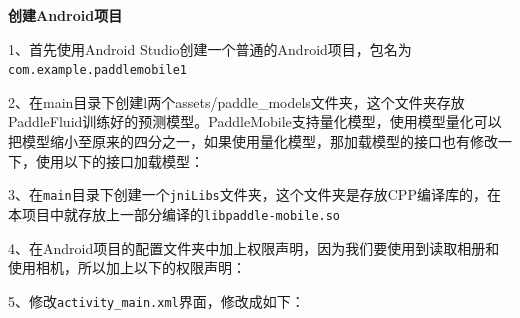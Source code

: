 \textbf{创建Android项目}

1、首先使用Android
Studio创建一个普通的Android项目，包名为\texttt{com.example.paddlemobile1}

2、在main目录下创建l两个assets/paddle\_models文件夹，这个文件夹存放PaddleFluid训练好的预测模型。PaddleMobile支持量化模型，使用模型量化可以把模型缩小至原来的四分之一，如果使用量化模型，那加载模型的接口也有修改一下，使用以下的接口加载模型：

\begin{Shaded}
\begin{Highlighting}[]
    \NormalTok{(}
\end{Highlighting}
\end{Shaded}

3、在\texttt{main}目录下创建一个\texttt{jniLibs}文件夹，这个文件夹是存放CPP编译库的，在本项目中就存放上一部分编译的\texttt{libpaddle-mobile.so}

4、在Android项目的配置文件夹中加上权限声明，因为我们要使用到读取相册和使用相机，所以加上以下的权限声明：

\begin{Shaded}
\begin{Highlighting}[]
\NormalTok{ />}
\NormalTok{ />}
\NormalTok{ />}
\end{Highlighting}
\end{Shaded}

5、修改\texttt{activity\_main.xml}界面，修改成如下：

